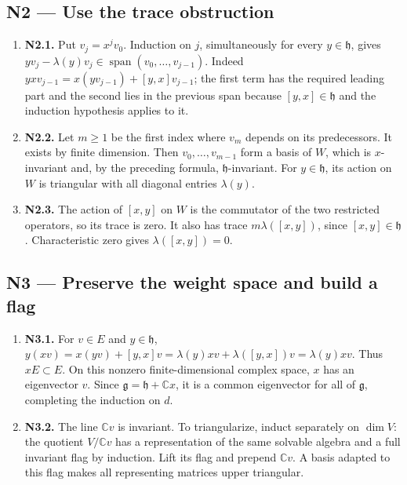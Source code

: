 \documentclass[preprint,12pt,aps,pra,showkeys,amsmath,amssymb,superscriptaddress,floatfix]{revtex4-2}
\theoremstyle{definition}
\theoremstyle{remark}
\begin{document}
\subsection{N2 --- Use the trace
obstruction}\label{n2-use-the-trace-obstruction}

\begin{enumerate}
\def\labelenumi{\arabic{enumi}.}
\item
  \textbf{N2.1.} Put \(v_j=x^jv_0\). Induction on \(j\), simultaneously
  for every \(y\in\mathfrak h\), gives
  \(yv_j-\lambda(y)v_j\in\operatorname{span}(v_0,\ldots,v_{j-1})\).
  Indeed \(yxv_{j-1}=x(yv_{j-1})+[y,x]v_{j-1}\); the first term has the
  required leading part and the second lies in the previous span because
  \([y,x]\in\mathfrak h\) and the induction hypothesis applies to it.
\item
  \textbf{N2.2.} Let \(m\ge1\) be the first index where \(v_m\) depends
  on its predecessors. It exists by finite dimension. Then
  \(v_0,\ldots,v_{m-1}\) form a basis of \(W\), which is \(x\)-invariant
  and, by the preceding formula, \(\mathfrak h\)-invariant. For
  \(y\in\mathfrak h\), its action on \(W\) is triangular with all
  diagonal entries \(\lambda(y)\).
\item
  \textbf{N2.3.} The action of \([x,y]\) on \(W\) is the commutator of
  the two restricted operators, so its trace is zero. It also has trace
  \(m\lambda([x,y])\), since \([x,y]\in\mathfrak h\). Characteristic
  zero gives \(\lambda([x,y])=0\).
\end{enumerate}

\subsection{N3 --- Preserve the weight space and build a
flag}\label{n3-preserve-the-weight-space-and-build-a-flag}

\begin{enumerate}
\def\labelenumi{\arabic{enumi}.}
\item
  \textbf{N3.1.} For \(v\in E\) and \(y\in\mathfrak h\),
  \(y(xv)=x(yv)+[y,x]v=\lambda(y)xv+\lambda([y,x])v=\lambda(y)xv\). Thus
  \(xE\subset E\). On this nonzero finite-dimensional complex space,
  \(x\) has an eigenvector \(v\). Since
  \(\mathfrak g=\mathfrak h+\mathbb Cx\), it is a common eigenvector for
  all of \(\mathfrak g\), completing the induction on \(d\).
\item
  \textbf{N3.2.} The line \(\mathbb Cv\) is invariant. To triangularize,
  induct separately on \(\dim V\): the quotient \(V/\mathbb Cv\) has a
  representation of the same solvable algebra and a full invariant flag
  by induction. Lift its flag and prepend \(\mathbb Cv\). A basis
  adapted to this flag makes all representing matrices upper triangular.
\end{enumerate}
\end{document}
